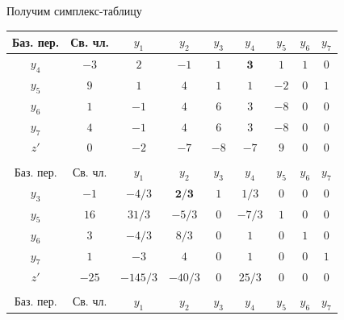 \documentclass[a4paper,14pt]{extarticle}
\begin{document}
Получим симплекс-таблицу
\begin{center}
    \begin{longtable}{|c|c|c|c|c|c|c|c|c|}
        \hline
        Баз. пер. & Св. чл.    & $y_1$    & $y_2$    & $y_3$    & $y_4 $     & $y_5$     & $y_6$ & $y_7$     \\
        \hline
        $y_4$     & $-3$       & $2$      & $-1$     & $1$      & $\textbf{3}$        & $1$       & $1$   & $0$       \\
        \hline
        $y_5$     & $9$        & $1$      & $4$      & $1$      & $1$        & $-2$      & $0$   & $1$       \\
        \hline
        $y_6$     & $1$        & $-1$     & $4$      & $6$      & $3$        & $-8$      & $0$   & $0$       \\
        \hline
        $y_7$     & $4$        & $-1$     & $4$      & $6$      & $3$        & $-8$      & $0$   & $0$       \\
        \hline
        $z'$      & $0$        & $-2$     & $-7$     & $-8$     & $-7$       & $9$       & $0$   & $0$       \\
        \hline
        \multicolumn{9}{c}{}                                                                                 \\
        \hline
        Баз. пер. & Св. чл.    & $y_1$    & $y_2$    & $y_3$    & $y_4 $     & $y_5$     & $y_6$ & $y_7$     \\
        \hline
        $y_3$     & $-1$       & $-4/3$   & $\textbf{2/3}$    & $1$      & $1/3$      & $0$       & $0$   & $0$       \\
        \hline
        $y_5$     & $16$       & $31/3$   & $-5/3$   & $0$      & $-7/3$     & $1$       & $0$   & $0$       \\
        \hline
        $y_6$     & $3$        & $-4/3$   & $8/3$    & $0$      & $1$        & $0$       & $1$   & $0$       \\
        \hline
        $y_7$     & $1$        & $-3$     & $4$      & $0$      & $1$        & $0$       & $0$   & $1$       \\
        \hline
        $z'$      & $-25$      & $-145/3$ & $-40/3$  & $0$      & $25/3$     & $0$       & $0$   & $0$       \\
        \hline
        \multicolumn{9}{c}{}                                                                                 \\
        \hline
        Баз. пер. & Св. чл.    & $y_1$    & $y_2$    & $y_3$    & $y_4 $     & $y_5$     & $y_6$ & $y_7$     \\

\end{longtable}
\end{center}
\end{document}

